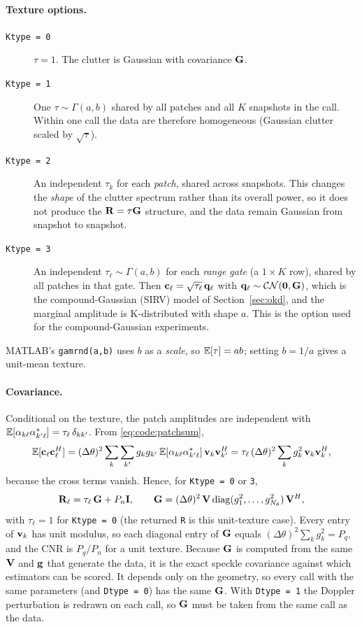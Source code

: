 \documentclass{article}
\begin{document}
\paragraph{Texture options.}
\begin{description}
  \item[\texttt{Ktype = 0}] $\tau=1$. The clutter is Gaussian with covariance $\mathbf{G}$.
  \item[\texttt{Ktype = 1}] One $\tau\sim\Gamma(a,b)$ shared by all patches and all $K$ snapshots in the call. Within one call the data are therefore homogeneous (Gaussian clutter scaled by $\sqrt\tau$).
  \item[\texttt{Ktype = 2}] An independent $\tau_k$ for each \emph{patch}, shared across snapshots. This changes the \emph{shape} of the clutter spectrum rather than its overall power, so it does not produce the $\mathbf{R}=\tau\mathbf{G}$ structure, and the data remain Gaussian from snapshot to snapshot.
  \item[\texttt{Ktype = 3}] An independent $\tau_\ell\sim\Gamma(a,b)$ for each \emph{range gate} (a $1\times K$ row), shared by all patches in that gate. Then $\vb c_\ell=\sqrt{\tau_\ell}\,\vb q_\ell$ with $\vb q_\ell\sim\mathcal{CN}(\vb 0,\mathbf{G})$, which is the compound-Gaussian (SIRV) model of Section~\ref{sec:okd}, and the marginal amplitude is K-distributed with shape $a$. This is the option used for the compound-Gaussian experiments.
\end{description}
MATLAB's \texttt{gamrnd(a,b)} uses $b$ as a \emph{scale}, so $\mathbb{E}[\tau]=ab$; setting $b=1/a$ gives a unit-mean texture.

\paragraph{Covariance.} Conditional on the texture, the patch amplitudes are independent with $\mathbb{E}[\alpha_{k\ell}\alpha_{k'\ell}^*] = \tau_\ell\,\delta_{kk'}$. From \eqref{eq:code:patchsum},
\[
  \mathbb{E}[\vb c_\ell\vb c_\ell^{H}]
  = (\Delta\theta)^2\sum_{k}\sum_{k'} g_kg_{k'}\,\mathbb{E}[\alpha_{k\ell}\alpha_{k'\ell}^*]\,\vb v_k\vb v_{k'}^{H}
  = \tau_\ell\,(\Delta\theta)^2\sum_{k}g_k^2\,\vb v_k\vb v_k^{H},
\]
because the cross terms vanish. Hence, for \texttt{Ktype = 0} or \texttt{3},
\begin{equation}
  \mathbf{R}_\ell = \tau_\ell\,\mathbf{G} + P_n\mathbf{I}, \qquad
  \mathbf{G} = (\Delta\theta)^2\,\mathbf{V}\,\mathrm{diag}(g_1^2,\dots,g_{N_\theta}^2)\,\mathbf{V}^{H},
  \label{eq:code:G}
\end{equation}
with $\tau_\ell=1$ for \texttt{Ktype = 0} (the returned \texttt{R} is this unit-texture case). Every entry of $\vb v_k$ has unit modulus, so each diagonal entry of $\mathbf{G}$ equals $(\Delta\theta)^2\sum_k g_k^2=P_q$, and the CNR is $P_q/P_n$ for a unit texture. Because $\mathbf{G}$ is computed from the same $\mathbf{V}$ and $\vb g$ that generate the data, it is the exact speckle covariance against which estimators can be scored. It depends only on the geometry, so every call with the same parameters (and \texttt{Dtype = 0}) has the same $\mathbf{G}$. With \texttt{Dtype = 1} the Doppler perturbation is redrawn on each call, so $\mathbf{G}$ must be taken from the same call as the data.
\end{document}
